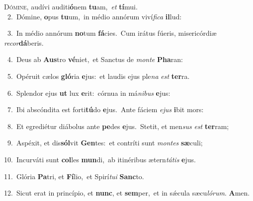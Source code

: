 \lettrine{\initial\textcolor{\initialcolor}{D}}{ómine,} audívi auditi\-\textbf{ó}\-nem \textbf{tu}\-am,~\star \textit{et} \textbf{tí}\-mui.\\
{\numbfont\textcolor{\numbcolor}{~2.}}~Dómine, \textbf{o}\-pus \textbf{tu}\-um,~\star in médio annórum viví\-\textit{fi}\-\textit{ca} \textbf{il}\-lud:\par
{\numbfont\textcolor{\numbcolor}{~3.}}~In médio annórum \textbf{no}\-tum \textbf{fá}\-cies.~\star Cum irátus fúeris, misericórdiæ \textit{re}\-\textit{cor}\textbf{dá}beris.\par
{\numbfont\textcolor{\numbcolor}{~4.}}~Deus ab \textbf{Aus}\-tro \textbf{vé}\-niet,~\star et Sanctus de \textit{mon}\-\textit{te} \textbf{Pha}\-ran:\par
{\numbfont\textcolor{\numbcolor}{~5.}}~Opéruit cælos \textbf{gló}\-ria \textbf{e}\-jus:~\star et laudis ejus ple\textit{na} \textit{est} \textbf{ter}\-ra.\par
{\numbfont\textcolor{\numbcolor}{~6.}}~Splendor ejus \textbf{ut} lux \textbf{e}\-rit:~\star córnua in má\-\textit{ni}\-\textit{bus} \textbf{e}\-jus:\par
{\numbfont\textcolor{\numbcolor}{~7.}}~Ibi abscóndita est forti\-\textbf{tú}\-do \textbf{e}\-jus.~\star Ante fáciem \textit{e}\-\textit{jus} \textbf{i}\-bit mors:\par
{\numbfont\textcolor{\numbcolor}{~8.}}~Et egrediétur diábolus ante \textbf{pe}\-des \textbf{e}\-jus.~\star Stetit, et men\textit{sus} \textit{est} \textbf{ter}\-ram;\par
{\numbfont\textcolor{\numbcolor}{~9.}}~Aspéxit, et dis\-\textbf{sól}\-vit \textbf{Gen}\-tes:~\star et contríti sunt \textit{mon}\-\textit{tes} \textbf{sæ}\-culi;\par
{\numbfont\textcolor{\numbcolor}{10.}}~Incurváti sunt \textbf{col}\-les \textbf{mun}\-di,~\star ab itinéribus ætern\-\textit{tá}\-\textit{tis} \textbf{e}\-jus.\par
{\numbfont\textcolor{\numbcolor}{11.}}~Glória \textbf{Pa}\-tri, et \textbf{Fí}\-lio,~\star et Spirí\-\textit{tu}\-\textit{i} \textbf{Sanc}\-to.\par
{\numbfont\textcolor{\numbcolor}{12.}}~Sicut erat in princípio, et \textbf{nunc}\-, et \textbf{sem}\-per,~\star et in sǽcula sæcu\-\textit{ló}\-\textit{rum}. \textbf{A}\-men.\par
